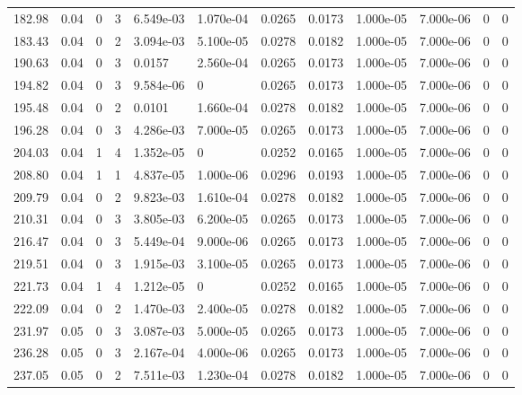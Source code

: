 \documentclass[preview]{standalone}
\begin{document}
{{{\begin{tabular}{L{1.2cm}C{1.2cm} C{0.3cm}C{0.5cm} C{1.4cm}C{1.4cm} C{1.4cm}C{1.4cm} C{1.6cm}C{1.6cm} C{1.6cm}C{1.6cm}}
  182.98  &  0.04  & 0     &  3 &  6.549e-03  & 1.070e-04  &  0.0265&   0.0173& 1.000e-05 & 7.000e-06   &  0 & 0  \\ 
  183.43  &  0.04  & 0     &  2 &  3.094e-03  & 5.100e-05  &  0.0278&   0.0182& 1.000e-05 & 7.000e-06   &  0 & 0  \\ 
  190.63  &  0.04  & 0     &  3 &  0.0157  & 2.560e-04  &  0.0265&   0.0173& 1.000e-05 & 7.000e-06   &  0 & 0  \\ 
  194.82  &  0.04  & 0     &  3 &  9.584e-06  & 0  &  0.0265&   0.0173& 1.000e-05 & 7.000e-06   &  0 & 0  \\ 
  195.48  &  0.04  & 0     &  2 &  0.0101  & 1.660e-04  &  0.0278&   0.0182& 1.000e-05 & 7.000e-06   &  0 & 0  \\ 
  196.28  &  0.04  & 0     &  3 &  4.286e-03  & 7.000e-05  &  0.0265&   0.0173& 1.000e-05 & 7.000e-06   &  0 & 0  \\ 
  204.03  &  0.04  & 1     &  4 &  1.352e-05  & 0  &  0.0252&   0.0165& 1.000e-05 & 7.000e-06   &  0 & 0  \\ 
  208.80  &  0.04  & 1     &  1 &  4.837e-05  & 1.000e-06  &  0.0296&   0.0193& 1.000e-05 & 7.000e-06   &  0 & 0  \\ 
  209.79  &  0.04  & 0     &  2 &  9.823e-03  & 1.610e-04  &  0.0278&   0.0182& 1.000e-05 & 7.000e-06   &  0 & 0  \\ 
  210.31  &  0.04  & 0     &  3 &  3.805e-03  & 6.200e-05  &  0.0265&   0.0173& 1.000e-05 & 7.000e-06   &  0 & 0  \\ 
  216.47  &  0.04  & 0     &  3 &  5.449e-04  & 9.000e-06  &  0.0265&   0.0173& 1.000e-05 & 7.000e-06   &  0 & 0  \\ 
  219.51  &  0.04  & 0     &  3 &  1.915e-03  & 3.100e-05  &  0.0265&   0.0173& 1.000e-05 & 7.000e-06   &  0 & 0  \\ 
  221.73  &  0.04  & 1     &  4 &  1.212e-05  & 0  &  0.0252&   0.0165& 1.000e-05 & 7.000e-06   &  0 & 0  \\ 
  222.09  &  0.04  & 0     &  2 &  1.470e-03  & 2.400e-05  &  0.0278&   0.0182& 1.000e-05 & 7.000e-06   &  0 & 0  \\ 
  231.97  &  0.05  & 0     &  3 &  3.087e-03  & 5.000e-05  &  0.0265&   0.0173& 1.000e-05 & 7.000e-06   &  0 & 0  \\ 
  236.28  &  0.05  & 0     &  3 &  2.167e-04  & 4.000e-06  &  0.0265&   0.0173& 1.000e-05 & 7.000e-06   &  0 & 0  \\ 
  237.05  &  0.05  & 0     &  2 &  7.511e-03  & 1.230e-04  &  0.0278&   0.0182& 1.000e-05 & 7.000e-06   &  0 & 0  \\ 

\end{tabular}}}}
\end{document}
